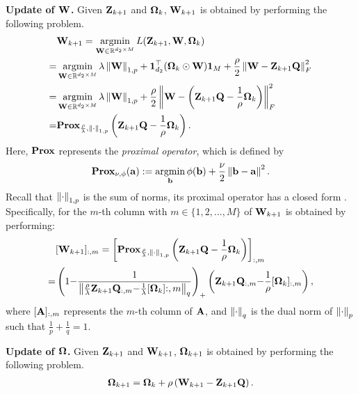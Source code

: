 \documentclass[journal]{IEEEtran}
\begin{document}
\textbf{Update of ${\bf W}$.} Given ${\bf Z}_{k+1}$ and $\boldsymbol{\Omega}_k$, ${\bf W}_{k+1}$ is obtained by performing the following problem.
\begin{align}
\nonumber
& \W_{k+1} = \argmin_{\W\in\RR^{d_2 \times M}} L(\Z_{k+1}, \W, \bOmega_k) \\ \nonumber
= & \argmin_{\W\in\RR^{d_2 \times M}} \lambda \lrnorm{\W}_{1,p} + \1_{d_2}^\top(\bOmega_k \odot \W)\1_M + \frac{\rho}{2}\lrnorm{\W - \Z_{k+1}\Q}_F^2 \\ \nonumber
= & \argmin_{\W\in\RR^{d_2 \times M}} \lambda \lrnorm{\W}_{1,p} + \frac{\rho}{2}\lrnorm{\W - \lrincir{\Z_{k+1}\Q - \frac{1}{\rho}\bOmega_k}}_F^2 \\ \nonumber
= & \Prox_{\frac{\rho}{\lambda}, \lrnorm{\cdot}_{1,p}}\lrincir{\Z_{k+1}\Q - \frac{1}{\rho}\bOmega_k}.
\end{align}  Here, $\textbf{Prox}$ represents the \textit{proximal operator}, which is defined by 
\begin{align}
\nonumber
\Prox_{\nu, \phi}(\a) := \argmin_{\b} \phi(\b) + \frac{\nu}{2}\lrnorm{\b - \a}^2.
\end{align} Recall that $\left\lVert\cdot\right\rVert_{1,p}$ is the sum of norms, its proximal operator has a closed form \cite{xx}. Specifically, for the $m$-th column with $m\in\{1,2, ..., M\}$ of ${\bf W}_{k+1}$ is obtained by performing:
\begin{align}
\nonumber
& [{\bf W}_{k+1}]_{:,m} = \left [ \textbf{Prox}_{\frac{\rho}{\lambda}, \left\lVert\cdot\right\rVert_{1,p}}\left( {\bf Z}_{k+1}{\bf Q} - \frac{1}{\rho}\boldsymbol{\Omega}_k \right) \right ]_{:,m} \\ \nonumber
=& \left( 1\mathrm{-} \frac{1}{\left\lVert\frac{\rho}{\lambda} {\bf Z}_{k+1}{\bf Q}_{:, m} \mathrm{-} \frac{1}{\lambda}[\boldsymbol{\Omega}_k]{:, m}\right\rVert_q} \right)_\mathrm{+} \left( {\bf Z}_{k+1}{\bf Q}_{:, m} \mathrm{-} \frac{1}{\rho}[\boldsymbol{\Omega}_k]_{:, m} \right),
\end{align} where $[{\bf A}]_{:,m}$ represents the $m$-th column of ${\bf A}$, and $\left\lVert\cdot\right\rVert_q$ is the dual norm of $\left\lVert\cdot\right\rVert_p$ such that $\frac{1}{p}+\frac{1}{q} = 1$.

\textbf{Update of $\boldsymbol{\Omega}$.} Given ${\bf Z}_{k+1}$ and ${\bf W}_{k+1}$, $\boldsymbol{\Omega}_{k+1}$ is obtained by performing the following problem.
\begin{align}
\nonumber
\boldsymbol{\Omega}_{k+1}  = \boldsymbol{\Omega}_k + \rho \left( {\bf W}_{k+1} - {\bf Z}_{k+1}{\bf Q} \right).
\end{align} 
\end{document}
